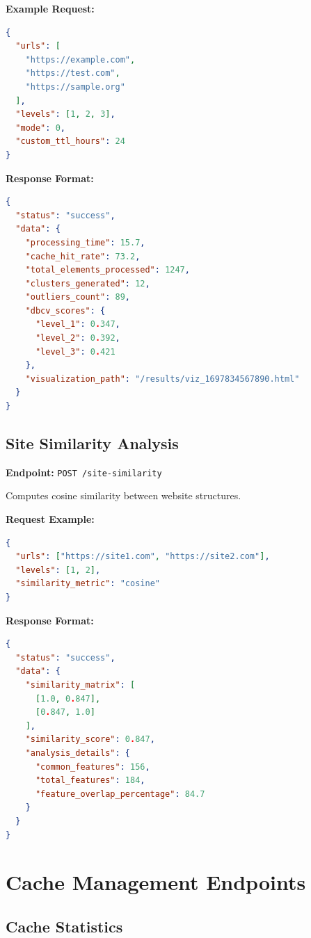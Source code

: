 \textbf{Example Request:}
\begin{lstlisting}[language=json]
{
  "urls": [
    "https://example.com",
    "https://test.com",
    "https://sample.org"
  ],
  "levels": [1, 2, 3],
  "mode": 0,
  "custom_ttl_hours": 24
}
\end{lstlisting}

\textbf{Response Format:}
\begin{lstlisting}[language=json]
{
  "status": "success",
  "data": {
    "processing_time": 15.7,
    "cache_hit_rate": 73.2,
    "total_elements_processed": 1247,
    "clusters_generated": 12,
    "outliers_count": 89,
    "dbcv_scores": {
      "level_1": 0.347,
      "level_2": 0.392,
      "level_3": 0.421
    },
    "visualization_path": "/results/viz_1697834567890.html"
  }
}
\end{lstlisting}

\subsection{Site Similarity Analysis}

\textbf{Endpoint:} \texttt{POST /site-similarity}

Computes cosine similarity between website structures.

\textbf{Request Example:}
\begin{lstlisting}[language=json]
{
  "urls": ["https://site1.com", "https://site2.com"],
  "levels": [1, 2],
  "similarity_metric": "cosine"
}
\end{lstlisting}

\textbf{Response Format:}
\begin{lstlisting}[language=json]
{
  "status": "success",
  "data": {
    "similarity_matrix": [
      [1.0, 0.847],
      [0.847, 1.0]
    ],
    "similarity_score": 0.847,
    "analysis_details": {
      "common_features": 156,
      "total_features": 184,
      "feature_overlap_percentage": 84.7
    }
  }
}
\end{lstlisting}

\section{Cache Management Endpoints}
\label{app:cache_endpoints}

\subsection{Cache Statistics}

